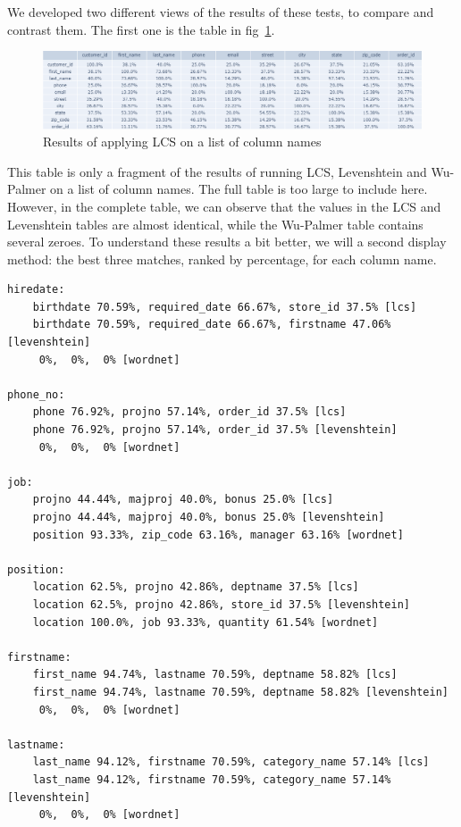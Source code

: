\bigbreak

We developed two different views of the results of these tests, to compare and contrast them.
The first one is the table in fig~\ref{fig:lcs_results}.

\begin{figure}[H]
    \centering
    \includegraphics[width=12cm]{figures/discovery_strategy/names_lcs_levenshtein_wordnet_small}
    \caption{Results of applying LCS on a list of column names}
    \label{fig:lcs_results}
\end{figure}

This table is only a fragment of the results of running LCS, Levenshtein and Wu-Palmer on a list of column names.
The full table is too large to include here.
However, in the complete table, we can observe that the values in the LCS and Levenshtein tables are almost identical,
while the Wu-Palmer table contains several zeroes.
To understand these results a bit better, we will a second display method: the best three matches, ranked by percentage,
for each column name.

\begin{verbatim}
hiredate:
	birthdate 70.59%, required_date 66.67%, store_id 37.5% [lcs]
	birthdate 70.59%, required_date 66.67%, firstname 47.06% [levenshtein]
	 0%,  0%,  0% [wordnet]

phone_no:
	phone 76.92%, projno 57.14%, order_id 37.5% [lcs]
	phone 76.92%, projno 57.14%, order_id 37.5% [levenshtein]
	 0%,  0%,  0% [wordnet]

job:
	projno 44.44%, majproj 40.0%, bonus 25.0% [lcs]
	projno 44.44%, majproj 40.0%, bonus 25.0% [levenshtein]
	position 93.33%, zip_code 63.16%, manager 63.16% [wordnet]

position:
	location 62.5%, projno 42.86%, deptname 37.5% [lcs]
	location 62.5%, projno 42.86%, store_id 37.5% [levenshtein]
	location 100.0%, job 93.33%, quantity 61.54% [wordnet]

firstname:
	first_name 94.74%, lastname 70.59%, deptname 58.82% [lcs]
	first_name 94.74%, lastname 70.59%, deptname 58.82% [levenshtein]
	 0%,  0%,  0% [wordnet]

lastname:
	last_name 94.12%, firstname 70.59%, category_name 57.14% [lcs]
	last_name 94.12%, firstname 70.59%, category_name 57.14% [levenshtein]
	 0%,  0%,  0% [wordnet]
\end{verbatim}

